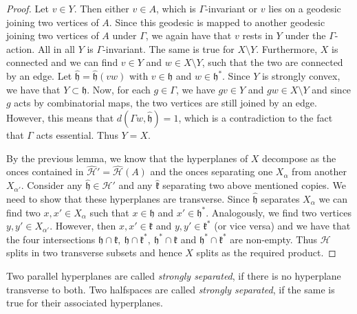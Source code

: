 \begin{proof}
  Let \(v \in Y\). Then either \(v \in A\), which is \(\Gamma\)-invariant or \(v\) lies on a geodesic joining two vertices of \(A\). Since this geodesic is mapped to another geodesic joining two vertices of \(A\) under \(\Gamma\), we again have that \(v\) rests in \(Y\) under the \(\Gamma\)-action. All in all \(Y\) is \(\Gamma\)-invariant. The same is true for \(X \setminus Y\). Furthermore, \(X\) is connected and we can find \(v \in Y\) and \(w \in X \setminus Y\), such that the two are connected by an edge. Let \(\mathfrak{\hat h} = \mathfrak{\hat h}(vw)\) with \(v \in \mathfrak{h}\) and \(w \in \mathfrak{h}^\ast\). Since \(Y\) is strongly convex, we have that \(Y \subset \mathfrak{h}\). Now, for each \(g \in \Gamma\), we have \(gv \in Y\) and \(gw \in X \setminus Y\) and since \(g\) acts by combinatorial maps, the two vertices are still joined by an edge. However, this means that \(d(\Gamma w, \mathfrak{\hat h}) = 1\), which is a contradiction to the fact that \(\Gamma\) acts essential. Thus \(Y = X\).

  By the previous lemma, we know that the hyperplanes of \(X\) decompose as the onces contained in \(\mathcal{\hat H'} = \mathcal{\hat H}(A)\) and the onces separating one \(X_\alpha\) from another \(X_{\alpha'}\). Consider any \(\mathfrak{\hat h} \in \mathcal{\hat H'}\) and any \(\mathfrak{\hat k}\) separating two above mentioned copies. We need to show that these hyperplanes are transverse. Since \(\mathfrak{\hat h}\) separates \(X_\alpha\) we can find two \(x, x' \in X_\alpha\) such that \(x \in \mathfrak{h}\) and \(x' \in \mathfrak{h}^\ast\). Analogously, we find two vertices \(y,y' \in X_{\alpha'}\). However, then \(x,x' \in \mathfrak{k}\) and \(y,y' \in \mathfrak{k}^\ast\) (or vice versa) and we have that the four intersections \(\mathfrak{h} \cap \mathfrak{k},\ \mathfrak{h} \cap \mathfrak{k}^\ast,\ \mathfrak{h}^\ast \cap \mathfrak{k}\) and \(\mathfrak{h}^\ast \cap \mathfrak{k}^\ast\) are non-empty. Thus \(\mathcal{H}\) splits in two transverse subsets and hence \(X\) splits as the required product.
\end{proof}

\begin{defin}
  Two parallel hyperplanes are called \emph{strongly separated}, if there is no hyperplane transverse to both. Two halfspaces are called \emph{strongly separated}, if the same is true for their associated hyperplanes.
\end{defin}

